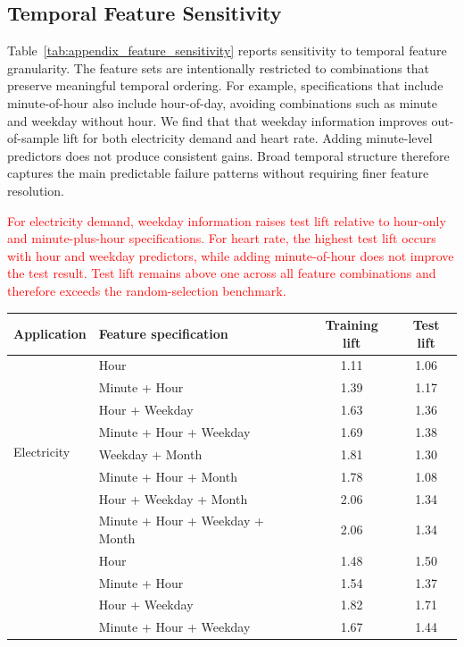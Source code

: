 \documentclass[12pt]{article}
\newcommand{\matt}[1]{\textcolor{red}{#1}}
\begin{document}
\subsection{Temporal Feature Sensitivity}

Table~\ref{tab:appendix_feature_sensitivity} reports sensitivity to temporal feature granularity. The feature sets are intentionally restricted to combinations that preserve meaningful temporal ordering. For example, specifications that include minute-of-hour also include hour-of-day, avoiding combinations such as minute and weekday without hour. We find that that weekday information improves out-of-sample lift for both electricity demand and heart rate. Adding minute-level predictors does not produce consistent gains. Broad temporal structure therefore captures the main predictable failure patterns without requiring finer feature resolution.

\matt{For electricity demand, weekday information raises test lift relative to hour-only and minute-plus-hour specifications. For heart rate, the highest test lift occurs with hour and weekday predictors, while adding minute-of-hour does not improve the test result. Test lift remains above one across all feature combinations and therefore exceeds the random-selection benchmark.}

{
\begin{samepage}
\begin{center}
\label{tab:appendix_feature_sensitivity}
{\small
\renewcommand{\arraystretch}{1}
\begin{tabularx}{\textwidth}{@{}l>{\raggedright\arraybackslash}Xcc@{}}
\toprule
\textbf{Application} & \textbf{Feature specification} & \textbf{Training lift} & \textbf{Test lift} \\
\midrule
\multirow{8}{*}{Electricity} & Hour & 1.11 & 1.06 \\
 & Minute + Hour & 1.39 & 1.17 \\
 & Hour + Weekday & 1.63 & 1.36 \\
 & Minute + Hour + Weekday & 1.69 & 1.38 \\
 & Weekday + Month & 1.81 & 1.30 \\
 & Minute + Hour + Month & 1.78 & 1.08 \\
 & Hour + Weekday + Month & 2.06 & 1.34 \\
 & Minute + Hour + Weekday + Month & 2.06 & 1.34 \\
\addlinespace
\multirow{4}{*}{Heart rate} & Hour & 1.48 & 1.50 \\
 & Minute + Hour & 1.54 & 1.37 \\
 & Hour + Weekday & 1.82 & 1.71 \\
 & Minute + Hour + Weekday & 1.67 & 1.44 \\
\bottomrule
\end{tabularx}
}
\end{center}
\end{samepage}
}
\end{document}
